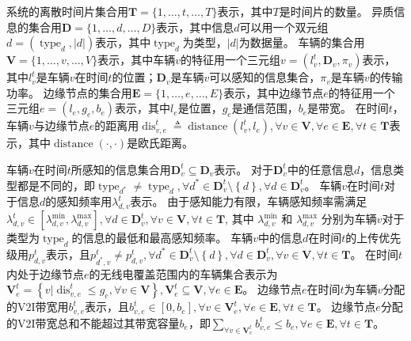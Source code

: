 系统的离散时间片集合用$\mathbf{T}=\{1, \ldots, t, \ldots, T\}$表示，其中$T$是时间片的数量。
异质信息的集合用$\mathbf{D}=\{1, \ldots, d, \ldots, D\}$表示，其中信息$d$可以用一个双元组$d=\left(\operatorname{type}_d, \left|d\right| \right)$表示，其中$\operatorname{type}_d$为类型，$\left|d\right|$为数据量。
车辆的集合用$\mathbf{V}=\{1, \ldots, v, \ldots, V\}$表示，其中车辆$v$的特征用一个三元组$v=\left (l_v^t, \mathbf{D}_v, \pi_v \right )$表示，其中$l_v^t$是车辆$v$在时间$t$的位置；$\mathbf{D}_v$是车辆$v$可以感知的信息集合，$\pi_v$是车辆$v$的传输功率。
边缘节点的集合用$\mathbf{E}=\{1, \ldots, e, \ldots, E\}$表示，其中边缘节点$e$的特征用一个三元组$e=\left (l_e, g_e, b_e \right)$表示，其中$l_e$是位置，$g_e$是通信范围，$b_e$是带宽。
在时间$t$，车辆$v$与边缘节点$e$的距离用$\operatorname{dis}_{v,e}^t \triangleq \operatorname{distance} \left (l_v^t, l_e \right ), \forall v \in \mathbf{V}, \forall e \in \mathbf{E}, \forall t \in \mathbf{T}$表示，其中$\operatorname{distance}\left(\cdot,\cdot\right)$是欧氏距离。

车辆$v$在时间$t$所感知的信息集合用$\mathbf{D}_v^t\subseteq \mathbf{D}_v$表示。
对于$\mathbf{D}_v^t$中的任意信息$d$，信息类型都是不同的，即$\operatorname{type}_{d^*} \neq \operatorname{type}_{d}, \forall d^* \in \mathbf{D}_v^t \setminus \left\{ d\right \}, \forall d \in \mathbf{D}_v^t$。
车辆$v$在时间$t$对于信息$d$的感知频率用$\lambda_{d,v}^t$表示。
由于感知能力有限，车辆感知频率需满足$\lambda_{d,v}^{t} \in [\lambda_{d,v}^{\min} , \lambda_{d,v}^{\max} ], \forall d \in \mathbf{D}_v^t, \forall v \in \mathbf{V}, \forall t \in \mathbf{T}$, 其中 $\lambda_{d,v}^{\min}$ 和 $\lambda_{d,v}^{\max}$ 分别为车辆$v$对于类型为$\operatorname{type}_{d}$的信息的最低和最高感知频率。
车辆$v$中的信息$d$在时间$t$的上传优先级用$p_{d,v}^t$表示，且${p}_{d^*, v}^t \neq {p}_{d, v}^t, \forall d^* \in \mathbf{D}_v^t \setminus \left\{ d\right \}, \forall d \in \mathbf{D}_v^t, \forall v \in \mathbf{V}, \forall t \in \mathbf{T}$。
在时间$t$内处于边缘节点$e$的无线电覆盖范围内的车辆集合表示为$\mathbf{V}_e^t=\left \{v \vert \operatorname{dis}_{v,e}^t \leq g_e, \forall v \in \mathbf{V} \right \}, \mathbf{V}_e^t \subseteq \mathbf{V}, \forall e \in \mathbf{E}$。
边缘节点$e$在时间$t$为车辆$v$分配的V2I带宽用$b_{v, e}^t$表示，且$b_{v, e}^t \in \left [0,b_e \right], \forall v \in \mathbf{V}_e^{t}, \forall e \in \mathbf{E}, \forall t \in \mathbf{T}$。
边缘节点$e$分配的V2I带宽总和不能超过其带宽容量$b_e$，即${\sum_{\forall v \in \mathbf{V}_e^{t}}b_{v, e}^t} \leq b_e, \forall e \in \mathbf{E}, \forall t \in \mathbf{T}$。

